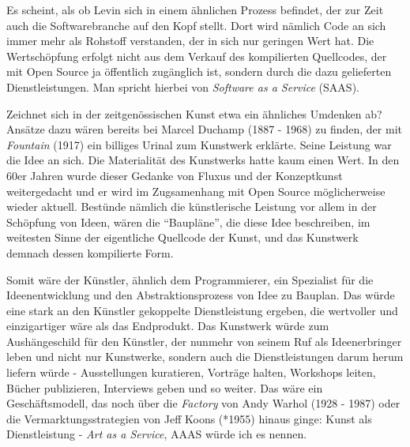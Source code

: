 \documentclass[
paper=164mm:234mm, %
pagesize, %
DIV=calc, %
10pt, %
BCOR=0mm, %
parskip=half- %
]{scrbook}
\begin{document}
Es scheint, als ob Levin sich in einem ähnlichen Prozess befindet, der zur Zeit auch die Softwarebranche auf den Kopf stellt. Dort wird nämlich Code an sich immer mehr als Rohstoff verstanden, der in sich nur geringen Wert hat. Die Wertschöpfung erfolgt nicht aus dem Verkauf des kompilierten Quellcodes, der mit Open Source ja öffentlich zugänglich ist, sondern durch die dazu gelieferten Dienstleistungen. Man spricht hierbei von \emph{Software as a Service} (SAAS).

Zeichnet sich in der zeitgenössischen Kunst etwa ein ähnliches Umdenken ab? Ansätze dazu wären bereits bei Marcel Duchamp (1887 - 1968) zu finden, der mit \emph{Fountain} (1917) ein billiges Urinal zum Kunstwerk erklärte. Seine Leistung war die Idee an sich. Die Materialität des Kunstwerks hatte kaum einen Wert. In den 60er Jahren wurde dieser Gedanke von Fluxus und der Konzeptkunst weitergedacht und er wird im Zugsamenhang mit Open Source möglicherweise wieder aktuell. Bestünde nämlich die künstlerische Leistung vor allem in der Schöpfung von Ideen, wären die \enquote{Baupläne}, die diese Idee beschreiben, im weitesten Sinne der eigentliche Quellcode der Kunst, und das Kunstwerk demnach dessen kompilierte Form.

Somit wäre der Künstler, ähnlich dem Programmierer, ein Spezialist für die Ideenentwicklung und den Abstraktionsprozess von Idee zu Bauplan. Das würde eine stark an den Künstler gekoppelte Dienstleistung ergeben, die wertvoller und einzigartiger wäre als das Endprodukt. Das Kunstwerk würde zum Aushängeschild für den Künstler, der nunmehr von seinem Ruf als Ideenerbringer leben und nicht nur Kunstwerke, sondern auch die Dienstleistungen darum herum liefern würde - Ausstellungen kuratieren, Vorträge halten, Workshops leiten, Bücher publizieren, Interviews geben und so weiter. Das wäre ein Geschäftsmodell, das noch über die \emph{Factory} von Andy Warhol (1928 - 1987) oder die Vermarktungsstrategien von Jeff Koons (*1955) hinaus ginge: Kunst als Dienstleistung - \emph{Art as a Service}, AAAS würde ich es nennen.
\end{document}
